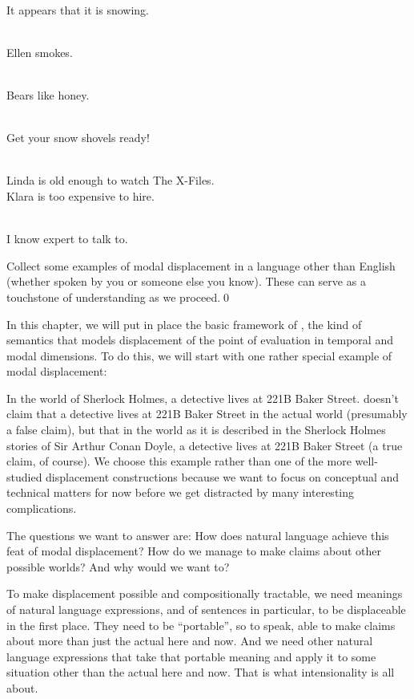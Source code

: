 \ex~ \\
It appears that it is snowing.\xe

\ex~ \\
Ellen smokes. \xe

\ex~ \\
Bears like honey. \xe

\ex~ \\
Get your snow shovels ready! \xe

\enlargethispage{24pt}
\ex~ \\
Linda is old enough to watch The X-Files.\\
Klara is too expensive to hire. \xe

\ex~ \\
I know  expert to talk to. \xe

\begin{exercise}
  Collect some examples of modal displacement in a language other than English
  (whether spoken by you or someone else you know). These can serve as a
  touchstone of understanding as we proceed.\qed
\end{exercise}

In this chapter, we will put in place the basic framework of , the kind of semantics that models displacement of the point of
evaluation in temporal and modal dimensions. To do this, we will start with one
rather special example of modal displacement:

\ex\label{sherlock}%
In the world of Sherlock Holmes, a detective lives at 221B Baker Street.\xe
%
\Last doesn't claim that a detective lives at 221B Baker Street in the actual
world (presumably a false claim), but that in the world as it is described in
the Sherlock Holmes stories of Sir Arthur Conan Doyle, a detective lives at 221B
Baker Street (a true claim, of course). We choose this example rather than one
of the more well-studied displacement constructions because we want to focus
on conceptual and technical matters for now before we get distracted by many
interesting complications.

The questions we want to answer are: %
How does natural language achieve this feat of modal displacement? How do we
manage to make claims about other possible worlds? And why would we want to?

To make displacement possible and compositionally tractable, we need meanings of
natural language expressions, and of sentences in particular, to be displaceable
in the first place. They need to be ``portable'', so to speak, able to make
claims about more than just the actual here and now. And we need other
natural language expressions that take that portable meaning and apply it to
some situation other than the actual here and now. That is what intensionality
is all about.

